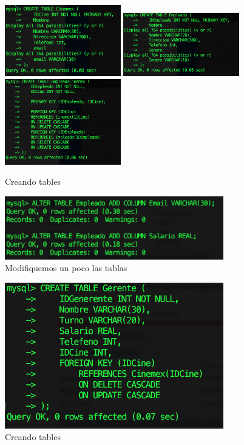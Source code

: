 \documentclass[12pt, fleqn]{article}                             %
\begin{document}
        \begin{figure}[h]
            \centering
            \includegraphics[width=0.45\textwidth]{BD2Reporte1}
            \includegraphics[width=0.45\textwidth]{BD2Reporte2}
            \includegraphics[width=0.45\textwidth]{BD2Reporte3}
            \caption{Creando tables}
        \end{figure}

        \begin{figure}[h]
            \centering
            \includegraphics[width=0.85\textwidth]{BD2Reporte4}
            \caption{Modifiquemos un poco las tablas}
        \end{figure}

        \begin{figure}[h]
            \centering
            \includegraphics[width=0.85\textwidth]{BD2Reporte5}
            \caption{Creando tables}
        \end{figure}
\end{document}
